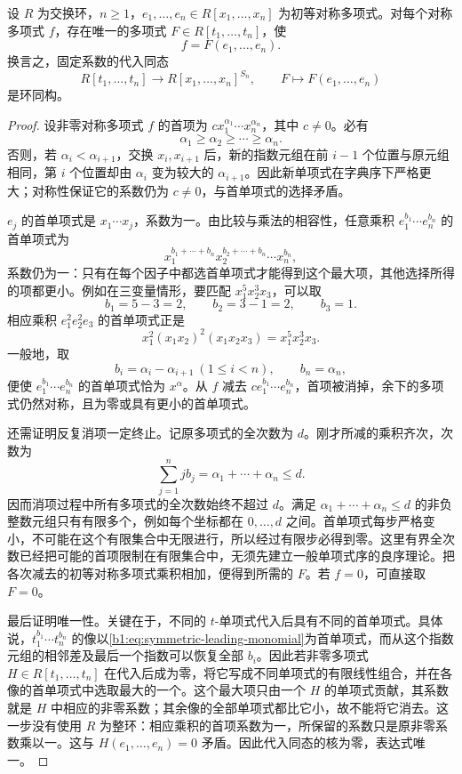 \begin{theorem}[对称多项式基本定理]\label{b1:thm:fundamental-symmetric-polynomials}
	设 \(R\) 为交换环，\(n\ge1\)，\(e_1,\ldots,e_n\in R[x_1,\ldots,x_n]\) 为初等对称多项式。对每个对称多项式 \(f\)，存在唯一的多项式 \(F\in R[t_1,\ldots,t_n]\)，使
	\[
		f=F(e_1,\ldots,e_n).
	\]
	换言之，固定系数的代入同态
	\[
		R[t_1,\ldots,t_n]\longrightarrow R[x_1,\ldots,x_n]^{S_n}, \qquad F\longmapsto F(e_1,\ldots,e_n)
	\]
	是环同构。
\end{theorem}
\begin{proof}
	设非零对称多项式 \(f\) 的首项为 \(cx_1^{\alpha_1}\cdots x_n^{\alpha_n}\)，其中 \(c\ne0\)。必有
	\[
		\alpha_1\ge\alpha_2\ge\cdots\ge\alpha_n.
	\]
	否则，若 \(\alpha_i<\alpha_{i+1}\)，交换 \(x_i,x_{i+1}\) 后，新的指数元组在前 \(i-1\) 个位置与原元组相同，第 \(i\) 个位置却由 \(\alpha_i\) 变为较大的 \(\alpha_{i+1}\)。因此新单项式在字典序下严格更大；对称性保证它的系数仍为 \(c\ne0\)，与首单项式的选择矛盾。

	\(e_j\) 的首单项式是 \(x_1\cdots x_j\)，系数为一。由比较与乘法的相容性，任意乘积 \(e_1^{b_1}\cdots e_n^{b_n}\) 的首单项式为
	\begin{equation}\label{b1:eq:symmetric-leading-monomial}
		x_1^{b_1+\cdots+b_n}x_2^{b_2+\cdots+b_n}\cdots x_n^{b_n},
	\end{equation}
	系数仍为一：只有在每个因子中都选首单项式才能得到这个最大项，其他选择所得的项都更小。例如在三变量情形，要匹配 \(x_1^5x_2^3x_3\)，可以取
	\[
		b_1=5-3=2,\qquad b_2=3-1=2,\qquad b_3=1.
	\]
	相应乘积 \(e_1^2e_2^2e_3\) 的首单项式正是
	\[
		x_1^2(x_1x_2)^2(x_1x_2x_3)=x_1^5x_2^3x_3.
	\]
	一般地，取
	\[
		b_i=\alpha_i-\alpha_{i+1}\ (1\le i<n), \qquad b_n=\alpha_n,
	\]
	便使 \(e_1^{b_1}\cdots e_n^{b_n}\) 的首单项式恰为 \(x^\alpha\)。从 \(f\) 减去 \(ce_1^{b_1}\cdots e_n^{b_n}\)，首项被消掉，余下的多项式仍然对称，且为零或具有更小的首单项式。

	还需证明反复消项一定终止。记原多项式的全次数为 \(d\)。刚才所减的乘积齐次，次数为
	\[
		\sum_{j=1}^n jb_j=\alpha_1+\cdots+\alpha_n\le d.
	\]
	因而消项过程中所有多项式的全次数始终不超过 \(d\)。满足 \(\alpha_1+\cdots+\alpha_n\le d\) 的非负整数元组只有有限多个，例如每个坐标都在 \(0,\ldots,d\) 之间。首单项式每步严格变小，不可能在这个有限集合中无限进行，所以经过有限步必得到零。这里有界全次数已经把可能的首项限制在有限集合中，无须先建立一般单项式序的良序理论。把各次减去的初等对称多项式乘积相加，便得到所需的 \(F\)。若 \(f=0\)，可直接取 \(F=0\)。

	最后证明唯一性。关键在于，不同的 \(t\)-单项式代入后具有不同的首单项式。具体说，\(t_1^{b_1}\cdots t_n^{b_n}\) 的像以\eqref{b1:eq:symmetric-leading-monomial}为首单项式，而从这个指数元组的相邻差及最后一个指数可以恢复全部 \(b_i\)。因此若非零多项式 \(H\in R[t_1,\ldots,t_n]\) 在代入后成为零，将它写成不同单项式的有限线性组合，并在各像的首单项式中选取最大的一个。这个最大项只由一个 \(H\) 的单项式贡献，其系数就是 \(H\) 中相应的非零系数；其余像的全部单项式都比它小，故不能将它消去。这一步没有使用 \(R\) 为整环：相应乘积的首项系数为一，所保留的系数只是原非零系数乘以一。这与 \(H(e_1,\ldots,e_n)=0\) 矛盾。因此代入同态的核为零，表达式唯一。
\end{proof}

